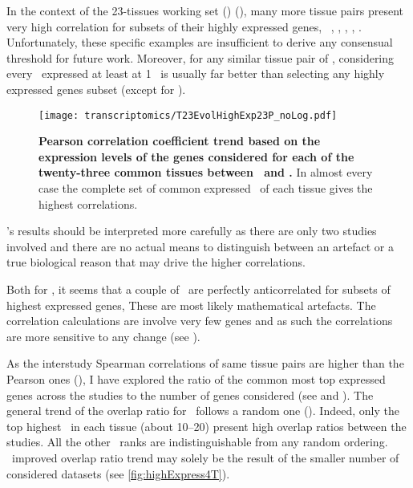 In the context of the 23-tissues working set (\setTwo) (),
many more tissue pairs present very high correlation for subsets of their highly
expressed genes, \ie\ \skeletal, \Thyroid, \Cortex, \Uterus, \Kidney.
Unfortunately, these specific examples are insufficient
to derive any consensual threshold for future work.
Moreover,
for any similar tissue pair of \setTwo,
considering every \pcg\ expressed at least at 1 \FPKM\ is usually
far better than selecting any highly expressed genes subset
(except for \kidney).

\begin{figure}[!htpb]
    \texttt{[image: transcriptomics/T23EvolHighExp23P\_noLog.pdf]}\centering
    \vspace{-3mm}
    \caption[Pearson correlation coefficient trend based on the expression
    levels of the genes considered for each of the 23 common tissues]{%
\label{fig:CorHighExp23T}\textbf{Pearson correlation coefficient trend based
on the expression levels of the genes considered
for each of the twenty-three common tissues between \uhlen\ and \gtex.}
In almost every case the complete set of common expressed \pcgs\ of each tissue gives
the highest correlations.}
\end{figure}

\setTwo{}'s results should be interpreted more carefully as
there are only two studies involved and
there are no actual means to distinguish
between an artefact or a true biological reason
that may drive the higher correlations.

Both for ,
it seems that a couple of \treps\ are perfectly anticorrelated
for subsets of highest expressed genes,
These are most likely mathematical artefacts.
The correlation calculations are involve very few genes
and as such the correlations are more sensitive to any change
(see ).

As the interstudy Spearman correlations of same tissue pairs
are higher than the Pearson ones (),
I have explored the ratio of the common most top expressed
genes across the studies to the number of genes considered
(see  and ).
The general trend of the overlap ratio for \setOne\ follows a random one
().
Indeed, only the top highest \pcgs\ in each tissue (about 10--20)
present high overlap ratios between the studies.
All the other \pcg\ ranks are indistinguishable from any random ordering.
\setTwo\ improved overlap ratio trend may solely be
the result of the smaller number of considered datasets
(see \cref{fig:highExpress4T}).

